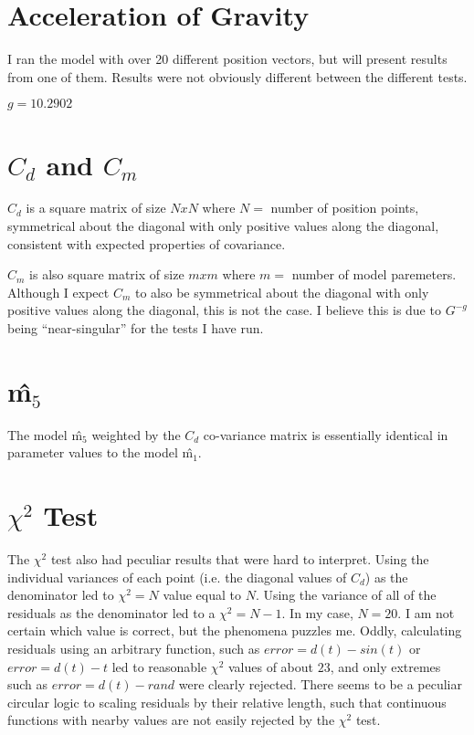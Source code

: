 \documentclass[12pt]{article}
\begin{document}
\section*{Acceleration of Gravity}

I ran the model with over 20 different position vectors, but will present results from one of them. Results were not obviously different between the different tests.

$g = 10.2902$

\section*{$C_d$ and $C_m$}

$C_d$ is a square matrix of size $NxN$ where $N=$ number of position points, symmetrical about the diagonal with only positive values along the diagonal, consistent with expected properties of covariance.

$C_m$ is also square matrix of size $mxm$ where $m=$ number of model paremeters. Although I expect $C_m$ to also be symmetrical about the diagonal with only positive values along the diagonal, this is not the case. I believe this is due to $G^{-g}$ being ``near-singular'' for the tests I have run. 

\section*{\^{m}$_{5}$}
The model \^{m}$_{5}$ weighted by the $C_d$ co-variance matrix is essentially identical in parameter values to the model \^{m}$_{1}$.

\section*{$\chi^{2}$ Test}
The $\chi^{2}$ test also had peculiar results that were hard to interpret. Using the individual variances of each point (i.e. the diagonal values of $C_d$) as the denominator led to $\chi^{2} = N$ value equal to $N$. Using the variance of all of the residuals as the denominator led to a $\chi^{2} = N-1$. In my case, $N = 20$. I am not certain which value is correct, but the phenomena puzzles me. Oddly, calculating residuals using an arbitrary function, such as $error = d(t) - sin(t)$ or $error = d(t) - t$ led to reasonable $\chi^{2}$ values of about $23$, and only extremes such as $error = d(t) - rand$ were clearly rejected. There seems to be a peculiar circular logic to scaling residuals by their relative length, such that continuous functions with nearby values are not easily rejected by the $\chi^{2}$ test.
\end{document}
